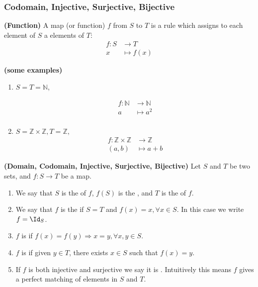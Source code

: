 \documentclass{article}
\newcommand{\bfs}[1]{\textbf{({#1}) }}
\begin{document}
\subsubsection{Codomain, Injective, Surjective, Bijective}
\begin{defa}{\bfs{Function}}
A map (or function) $f$ from $S$ to $T$ is a rule which assigns to each element of $S$ a  elements of $T$:
$$
\begin{aligned}
f: S & \rightarrow T \\
x & \mapsto f(x)
\end{aligned}
$$
\end{defa} 
\begin{exma}{\bfs{some examples}}
\begin{enumerate}
    \item $S=T=\mathbb{N}$,

\begin{align*}
    f: \mathbb{N} & \rightarrow \mathbb{N} \\
a & \mapsto a^{2} \\
\end{align*}
\item $S=\mathbb{Z} \times \mathbb{Z}, T=\mathbb{Z},$
\begin{align*}
f: \mathbb{Z} \times \mathbb{Z} & \rightarrow \mathbb{Z} \\
(a, b) & \mapsto a+b
\end{align*}
\end{enumerate}
\end{exma}
\begin{defa}{\bfs{Domain, Codomain, Injective, Surjective, Bijective}}
Let $S$ and $T$ be two sets, and $f: S \rightarrow T$ be a map.
\begin{enumerate}
    \item We say that $S$ is the  of $f$, $f(S)$ is the , and $T$ is the  of $f$.
    \item We say that $f$ is the  if $S=T$ and $f(x)=x, \forall x \in S$. In this case we write $f=\Id_{S}$.
    \item $f$ is  if $f(x)=f(y) \Rightarrow x=y, \forall x, y \in S$.
    \item $f$ is  if given $y \in T$, there exists $x \in S$ such that $f(x)=y$.
    \item If $f$ is both injective and surjective we say it is . Intuitively this means $f$ gives a perfect matching of elements in $S$ and $T$.
\end{enumerate}
\end{defa} 
\end{document}
